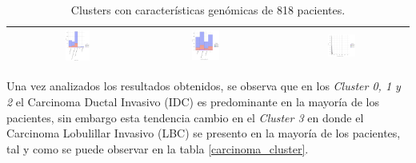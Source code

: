 \begin{table}
\begin{center}
\begin{tabular}{ |c|c|c|c| }
			& \includegraphics[width=0.22\textwidth]{NOTEBOOK/IMAGENES_BIRCH_DESCRIPTIVAS/38} 
			& \includegraphics[width=0.22\textwidth]{NOTEBOOK/IMAGENES_BIRCH_DESCRIPTIVAS/39} 
			& \includegraphics[width=0.22\textwidth]{NOTEBOOK/IMAGENES_BIRCH_DESCRIPTIVAS/40} 
			\\  \hline                  
		\end{tabular} 
			\caption{Clusters con características genómicas de 818 pacientes.}
			\label{clusters}
	\end{center} 
\end{table}
\break
Una vez analizados los resultados obtenidos, se observa que en los \textit {Cluster 0, 1 y 2} el Carcinoma  Ductal Invasivo (IDC) es predominante en la mayoría de los pacientes, sin embargo esta tendencia cambio en el \textit{Cluster 3} en donde el Carcinoma Lobulillar Invasivo (LBC) se presento en la mayoría de los pacientes, tal y como se puede observar en la tabla \ref{carcinoma_cluster}. 
